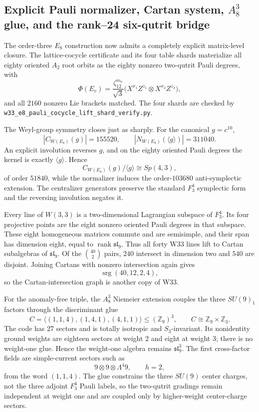 \subsection{Explicit Pauli normalizer, Cartan system, $A_8^3$ glue, and the rank--24 six-qutrit bridge}
\label{sec:execute-all5-pauli-stack}

The order-three $E_8$ construction now admits a completely explicit matrix-level closure.  The lattice-cocycle certificate and its four table shards materialize all eighty oriented $A_2$ root orbits as the eighty nonzero two-qutrit Pauli degrees, with
\[
 \Phi(E_v)=\frac{\zeta_{12}^{m_v}}{\sqrt3}
 \bigl(X^{x_1}Z^{z_1}\otimes X^{x_2}Z^{z_2}\bigr),
\]
and all $2160$ nonzero Lie brackets matched.  The four shards are checked by \texttt{w33\_e8\_pauli\_cocycle\_lift\_shard\_verify.py}.

The Weyl-group symmetry closes just as sharply.  For the canonical $g=c^{10}$,
\[
 |C_{W(E_8)}(g)|=155520,
 \qquad
 |N_{W(E_8)}(\langle g\rangle)|=311040.
\]
An explicit involution reverses $g$, and on the eighty oriented Pauli degrees the kernel is exactly $\langle g\rangle$.  Hence
\[
 C_{W(E_8)}(g)/\langle g\rangle\cong Sp(4,3),
\]
of order $51840$, while the normalizer induces the order-$103680$ anti-symplectic extension.  The centralizer generators preserve the standard $F_3^4$ symplectic form and the reversing involution negates it.

Every line of $W(3,3)$ is a two-dimensional Lagrangian subspace of $F_3^4$.  Its four projective points are the eight nonzero oriented Pauli degrees in that subspace.  These eight homogeneous matrices commute and are semisimple, and their span has dimension eight, equal to $\operatorname{rank}\mathfrak{sl}_9$.  Thus all forty W33 lines lift to Cartan subalgebras of $\mathfrak{sl}_9$.  Of the $\binom{40}{2}$ pairs, $240$ intersect in dimension two and $540$ are disjoint.  Joining Cartans with nonzero intersection again gives
\[
 \operatorname{srg}(40,12,2,4),
\]
so the Cartan-intersection graph is another copy of W33.

For the anomaly-free triple, the $A_8^3$ Niemeier extension couples the three $SU(9)_1$ factors through the discriminant glue
\[
 C=\langle(1,1,4),(1,4,1),(4,1,1)\rangle
 \le (\mathbb Z_9)^3,
 \qquad C\cong\mathbb Z_9\times\mathbb Z_3.
\]
The code has $27$ sectors and is totally isotropic and $S_3$-invariant.  Its nonidentity ground weights are eighteen sectors at weight $2$ and eight at weight $3$; there is no weight-one glue.  Hence the weight-one algebra remains $\mathfrak{sl}_9^3$.  The first cross-factor fields are simple-current sectors such as
\[
 9\otimes9\otimes\Lambda^4 9,
 \qquad h=2,
\]
from the word $(1,1,4)$.  The glue constrains the three $SU(9)$ center charges, not the three adjoint $F_3^4$ Pauli labels, so the two-qutrit gradings remain independent at weight one and are coupled only by higher-weight center-charge sectors.

